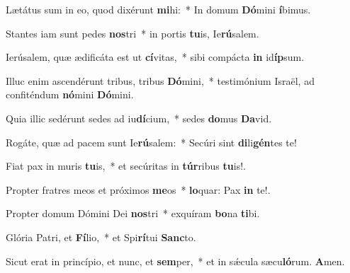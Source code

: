 \item Lætátus sum in eo, quod dixérunt \textbf{mi}hi:~* In domum \textbf{Dó}mini \textbf{í}bimus.

\item Stantes iam sunt pedes \textbf{nos}tri~* in portis \textbf{tu}is, Ie\textbf{rú}salem.

\item Ierúsalem, quæ ædificáta est ut \textbf{cí}vitas,~* sibi compácta \textbf{in} id\textbf{íp}sum.

\item Illuc enim ascendérunt tribus, tribus \textbf{Dó}mini,~* testimónium Israël, ad confiténdum \textbf{nó}mini \textbf{Dó}mini.

\item Quia illic sedérunt sedes ad iu\textbf{dí}cium,~* sedes \textbf{do}mus \textbf{Da}vid.

\item Rogáte, quæ ad pacem sunt Ie\textbf{rú}salem:~* Secúri sint \textbf{di}li\textbf{gén}tes te!

\item Fiat pax in muris \textbf{tu}is,~* et secúritas in \textbf{túr}ribus \textbf{tu}is!.

\item Propter fratres meos et próximos \textbf{me}os~* \textbf{lo}quar: Pax \textbf{in} te!.

\item Propter domum Dómini Dei \textbf{nos}tri~* exquíram \textbf{bo}na \textbf{ti}bi.

\item Glória Patri, et \textbf{Fí}lio,~* et Spi\textbf{rí}tui \textbf{Sanc}to.

\item Sicut erat in princípio, et nunc, et \textbf{sem}per,~* et in sǽcula sæcu\textbf{ló}rum. \textbf{A}men.
